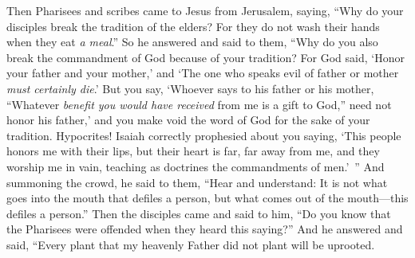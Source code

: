\begin{biblechapter} %
 Then Pharisees and scribes came to Jesus from Jerusalem, saying,
\verse “Why do your disciples break the tradition of the elders? For they do not wash their hands when they eat \textit{a meal}.”
\verse So he answered and said to them, “Why do you also break the commandment of God because of your tradition?
\verse For God said, ‘Honor your father and your mother,’ and ‘The one who speaks evil of father or mother \textit{must certainly die}.’
\verse But you say, ‘Whoever says to his father or his mother, “Whatever \textit{benefit you would have received} from me is a gift to God,”
\verse need not honor his father,’ and you make void the word of God for the sake of your tradition.
\verse Hypocrites! Isaiah correctly prophesied about you saying,
\verse ‘This people honors me with their lips, 
but their heart is far, far away from me,
\verse and they worship me in vain, 
teaching as doctrines the commandments of men.’ ”
 And summoning the crowd, he said to them, “Hear and understand:
\verse It is not what goes into the mouth that defiles a person, but what comes out of the mouth—this defiles a person.”
\verse Then the disciples came and said to him, “Do you know that the Pharisees were offended when they heard this saying?”
\verse And he answered and said, “Every plant that my heavenly Father did not plant will be uprooted.

\end{biblechapter}
